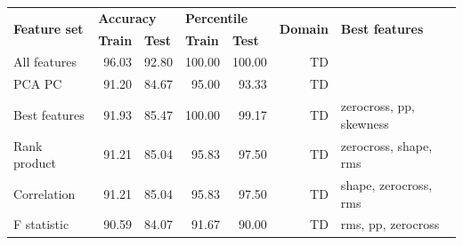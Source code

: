 \begin{table}[h]
\centering
\begin{adjustbox}{width=\textwidth}
\begin{tabular}{|l|rr|rr|r|l|}
\hline
\multirow{2}{*}{\textbf{Feature set}} & \multicolumn{2}{l|}{\textbf{Accuracy}}                                   & \multicolumn{2}{l|}{\textbf{Percentile}}                 & \multicolumn{1}{l|}{\multirow{2}{*}{\textbf{Domain}}} & \multirow{2}{*}{\textbf{Best features}} \\ \cline{2-5}
                                      & \multicolumn{1}{l|}{\textbf{Train}} & \multicolumn{1}{l|}{\textbf{Test}} & \multicolumn{1}{l|}{\textbf{Train}} & \multicolumn{1}{l|}{\textbf{Test}} & \multicolumn{1}{l|}{}                               &                                         \\ \hline
All features                          & \multicolumn{1}{r|}{96.03}          & 92.80                              & \multicolumn{1}{r|}{100.00}         & 100.00                             & TD                                                   &                                         \\ \hline
PCA PC                                & \multicolumn{1}{r|}{91.20}          & 84.67                              & \multicolumn{1}{r|}{95.00}          & 93.33                              & TD                                                   &                                         \\ \hline
Best features                         & \multicolumn{1}{r|}{91.93}          & 85.47                              & \multicolumn{1}{r|}{100.00}         & 99.17                              & TD                                                   & zerocross, pp, skewness                 \\ \hline
Rank product                          & \multicolumn{1}{r|}{91.21}          & 85.04                              & \multicolumn{1}{r|}{95.83}          & 97.50                              & TD                                                   & zerocross, shape, rms                   \\ \hline
Correlation                           & \multicolumn{1}{r|}{91.21}          & 85.04                              & \multicolumn{1}{r|}{95.83}          & 97.50                              & TD                                                   & shape, zerocross, rms                   \\ \hline
F statistic                           & \multicolumn{1}{r|}{90.59}          & 84.07                              & \multicolumn{1}{r|}{91.67}          & 90.00                              & TD                                                   & rms, pp, zerocross                      \\ \hline

\end{tabular}
\end{adjustbox}
\end{table}
